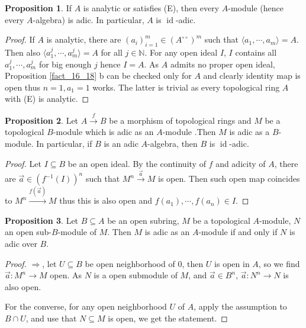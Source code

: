 \documentclass[10pt]{article}
\numberwithin{equation}{section}
\theoremstyle{definition}
\newtheorem{proposition}{Proposition}[subsection]
\DeclareMathOperator{\id}{id}
\newcommand{\N}[0]{\mathbb{N}}
\newcommand{\dcirc}[0]{{\circ\circ}}
\begin{document}
\begin{proposition}
    \label{fact_16_20}
    If $A$ is analytic or satisfies (E), then every $A$-module (hence every $A$-algebra) is adic. In particular, $A$ is $\id$-adic.
\end{proposition}
\begin{proof}
     If $A$ is analytic, there are $(a_i)_{i=1}^m\in (A^\dcirc)^m$ such that $\langle a_1,\cdots,a_m\rangle=A$. Then also $\langle a_1^j,\cdots,a_m^j\rangle =A$ for all $j\in\N$. For any open ideal $I$, $I$ contains all $a_1^j,\cdots,a_m^j$ for big enough $j$ hence $I = A$. As $A$ admits no proper open ideal, Proposition \ref{fact_16_18} b can be checked only for $A$ and clearly identity map is open thus $n=1,a_1=1$ works. The latter is trivial as every topological ring $A$ with (E) is analytic.
\end{proof}

\begin{proposition}
    \label{fact_16_21}
    Let $A\stackrel{f}{\to} B$ be a morphism of topological rings and $M$ be a topological $B$-module which is adic as an $A$-module .Then $M$ is adic as a $B$-module. In particular, if $B$ is an adic $A$-algebra, then $B$ is $\id$-adic.
\end{proposition}
\begin{proof}
Let $I\subseteq B$ be an open ideal. By the continuity of $f$ and adicity of $A$, there are $\vec{a}\in(f^{-1}(I))^n$ such that $M^n\stackrel{\vec{a}}{\to} M$ is open.
Then such open map coincides to $M^n\stackrel{f(\vec{a})}{\to} M$ thus this is also open and $f(a_1),\cdots,f(a_n)\in I$.
\end{proof}

\begin{proposition}
    \label{fact_16_22}
    Let $B\subseteq A$ be an open subring, $M$ be a topological $A$-module, $N$ an open sub-$B$-module of $M$. Then $M$ is adic as an $A$-module if and only if $N$ is adic over $B$.
\end{proposition}
\begin{proof}
    $\Rightarrow$, let $U\subseteq B$ be open neighborhood of $0$, then $U$ is open in $A$, so we find $\vec{a}:M^n\to M$ open. As $N$ is a open submodule of $M$, and $\vec{a}\in B^n$, $\vec{a}:N^n\to N$ is also open.
    \par For the converse, for any open neighborhood $U$ of $A$, apply the assumption to $B\cap U$, and use that $N\subseteq M$ is open, we get the statement.
\end{proof}
\end{document}
